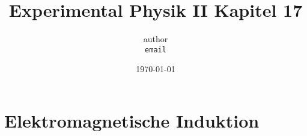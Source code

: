 \documentclass[11pt]{article}
\begin{document}
	\title{Experimental Physik II Kapitel 17}
		\author
			{
				author\\
				{\small 	\texttt{email}}
			}
		\date{\today}
	\maketitle
	\tableofcontents
	\setcounter{section}{17} %
	\newpage
	
\section{Elektromagnetische Induktion}

	
\end{document}
